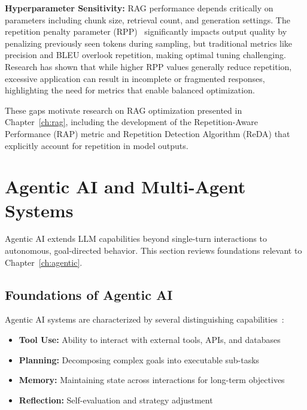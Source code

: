 \textbf{Hyperparameter Sensitivity:} RAG performance depends critically on parameters including chunk size, retrieval count, and generation settings. The repetition penalty parameter (RPP)~\cite{keskar2019ctrl} significantly impacts output quality by penalizing previously seen tokens during sampling, but traditional metrics like precision and BLEU overlook repetition, making optimal tuning challenging. Research has shown that while higher RPP values generally reduce repetition, excessive application can result in incomplete or fragmented responses, highlighting the need for metrics that enable balanced optimization.


These gaps motivate research on RAG optimization presented in Chapter~\ref{ch:rag}, including the development of the Repetition-Aware Performance (RAP) metric and Repetition Detection Algorithm (ReDA) that explicitly account for repetition in model outputs.

\section{Agentic AI and Multi-Agent Systems}
\label{sec:lit_agentic}

Agentic AI extends LLM capabilities beyond single-turn interactions to autonomous, goal-directed behavior. This section reviews foundations relevant to Chapter~\ref{ch:agentic}.

\subsection{Foundations of Agentic AI}

Agentic AI systems are characterized by several distinguishing capabilities~\cite{chawla2024agentic,acharya2025agentic}:

\begin{itemize}[leftmargin=*]
    \item \textbf{Tool Use:} Ability to interact with external tools, APIs, and databases~\cite{schick2023toolformer,shen2023hugginggpt}
    \item \textbf{Planning:} Decomposing complex goals into executable sub-tasks
    \item \textbf{Memory:} Maintaining state across interactions for long-term objectives
    \item \textbf{Reflection:} Self-evaluation and strategy adjustment
\end{itemize}

